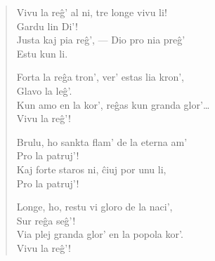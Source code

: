 \begin{verse}
                  Vivu la re\^g' al ni, tre longe vivu li!\\
                    \vin\vin    Gardu lin Di'!\\
                  Justa kaj pia re\^g', --- Dio pro nia pre\^g'\\
                    \vin\vin    Estu kun li.

                  Forta la re\^ga tron', ver' estas lia kron',\\
                    \vin\vin    Glavo la le\^g'.\\
                  Kun amo en la kor', re\^gas kun granda glor'\dots\\
                     \vin\vin   Vivu la re\^g'!

                  Brulu, ho sankta flam' de la eterna am'\\
                     \vin\vin   Pro la patruj'!\\
                  Kaj forte staros ni, \^ciuj por unu li,\\
                     \vin\vin   Pro la patruj'!

                  Longe, ho, restu vi gloro de la naci',\\
                     \vin\vin   Sur re\^ga se\^g'!\\
                  Via plej granda glor' en la popola kor'.\\
                    \vin\vin    Vivu la re\^g'!

\end{verse}


\smallrule{}


